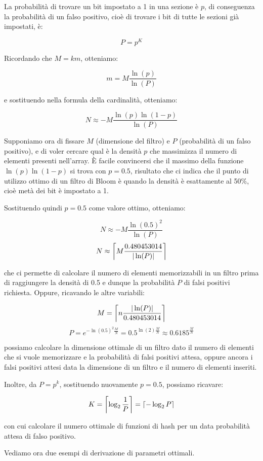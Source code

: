 La probabilità di trovare un bit impostato a 1 in una sezione è $p$, di conseguenza la probabilità 
di un falso positivo, cioè di trovare i bit di tutte le sezioni già impostati, è:

$$ P = p^K $$

Ricordando che $M=km$, otteniamo:

$$ m = M\frac{\ln(p)}{\ln(P)} $$

e sostituendo nella formula della cardinalità, otteniamo:

$$ N \approx -M\frac{\ln(p)\ln(1-p)}{\ln(P)} $$

Supponiamo ora di fissare $M$ (dimensione del filtro) e $P$ (probabilità di un falso positivo), e di
voler cercare qual è la densità $p$ che massimizza il numero di elementi presenti nell'array. È
facile convincersi che il massimo della funzione $\ln(p)\ln(1-p)$ si trova con $p=0.5$, risultato
che ci indica che il punto di utilizzo ottimo di un filtro di Bloom è quando la densità è
esattamente al 50\%, cioè metà dei bit è impostato a 1.

Sostituendo quindi $p=0.5$ come valore ottimo, otteniamo:

$$ N \approx -M\frac{\ln(0.5)^2}{\ln(P)} $$
$$ N \approx \ceil*{M\frac{0.480453014}{|\ln(P)|}} $$

che ci permette di calcolare il numero di elementi memorizzabili in un filtro prima di raggiungere
la densità di 0.5 e dunque la probabilità $P$ di falsi positivi richiesta. Oppure, ricavando
le altre variabili:

$$ M = \ceil*{n\frac{|\ln(P)|}{0.480453014}} $$
$$ P = e^{-\ln(0.5)^2\frac{M}{N}} = 0.5^{\ln(2)\frac{M}{N}} \approx 0.6185^{\frac{M}{N}} $$

possiamo calcolare la dimensione ottimale di un filtro dato il numero di elementi che si vuole
memorizzare e la probabilità di falsi positivi attesa, oppure ancora i falsi positivi attesi
data la dimensione di un filtro e il numero di elementi inseriti. 

Inoltre, da $P = p^k$, sostituendo nuovamente $p=0.5$, possiamo ricavare:

$$ K = \ceil*{\log_2{\frac{1}{P}}} = \ceil*{-\log_2{P}} $$

con cui calcolare il numero ottimale di funzioni di hash per un data probabilità attesa di falso
positivo.

Vediamo ora due esempi di derivazione di parametri ottimali. 

